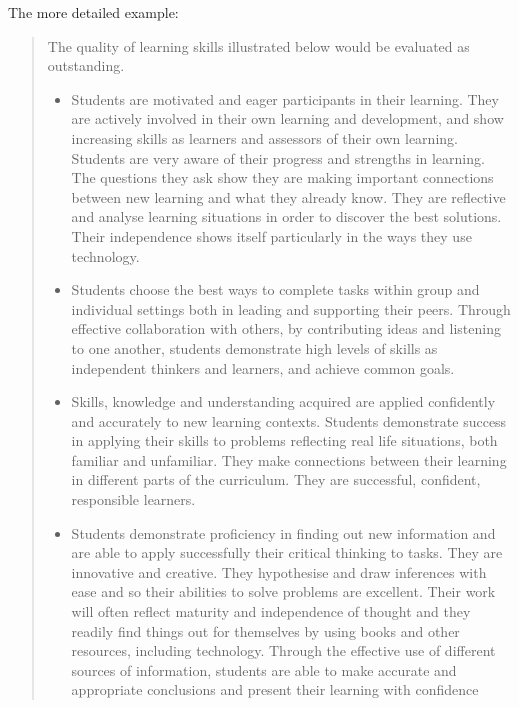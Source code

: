 The more detailed example:
\begin{quote}
The quality of learning skills illustrated below would be evaluated as outstanding.
\begin{itemize}
\item Students are motivated and eager participants in their learning. They are actively involved in their own learning and development, and show increasing skills as learners and assessors of their own learning. Students are very aware of their progress and strengths in learning. The questions they ask show they are making important connections between new learning and what they already know. They are reflective and analyse learning situations in order to discover the best solutions. Their independence shows itself particularly in the ways they use technology.
\item Students choose the best ways to complete tasks within group and individual settings both in leading and supporting their peers. Through effective collaboration with others, by contributing ideas and listening to one another, students demonstrate high levels of skills as independent thinkers and learners, and achieve common goals.
\item Skills, knowledge and understanding acquired are applied confidently and accurately to new learning contexts. Students demonstrate success in applying their skills to problems reflecting real life situations, both familiar and unfamiliar. They make connections between their learning in different parts of the curriculum. They are successful, confident, responsible learners.
\item Students demonstrate proficiency in finding out new information and are able to apply successfully their critical thinking to tasks. They are innovative and creative. They hypothesise and draw inferences with ease and so their abilities to solve problems are excellent. Their work will often reflect maturity and independence of thought and they readily find things out for themselves by using books and other resources, including technology. Through the effective use of different sources of information, students are able to make accurate and appropriate conclusions and present their learning with confidence
\end{itemize}
\end{quote}

